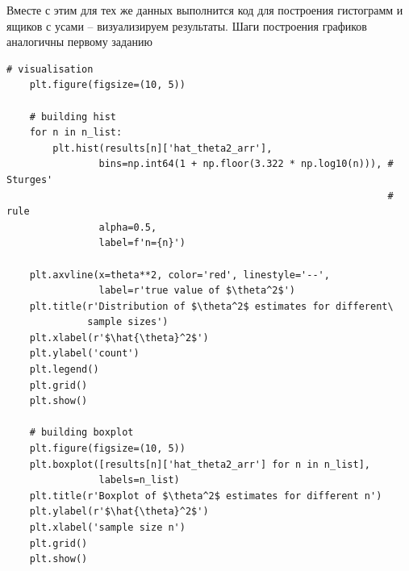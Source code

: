 \documentclass[a4paper, 12pt]{article}
\begin{document}
    Вместе с этим для тех же данных выполнится код для построения гистограмм и ящиков с усами -- визуализируем результаты.
    Шаги построения графиков аналогичны первому заданию
    \begin{lstlisting}[label=graphs2, caption={Код для визуализации результатов}]
    # visualisation
    plt.figure(figsize=(10, 5))

    # building hist
    for n in n_list:
        plt.hist(results[n]['hat_theta2_arr'], 
                bins=np.int64(1 + np.floor(3.322 * np.log10(n))), # Sturges'
                                                                  # rule
                alpha=0.5, 
                label=f'n={n}')

    plt.axvline(x=theta**2, color='red', linestyle='--',
                label=r'true value of $\theta^2$')
    plt.title(r'Distribution of $\theta^2$ estimates for different\
              sample sizes')
    plt.xlabel(r'$\hat{\theta}^2$')
    plt.ylabel('count')
    plt.legend()
    plt.grid()
    plt.show()

    # building boxplot
    plt.figure(figsize=(10, 5))
    plt.boxplot([results[n]['hat_theta2_arr'] for n in n_list],
                labels=n_list)
    plt.title(r'Boxplot of $\theta^2$ estimates for different n')
    plt.ylabel(r'$\hat{\theta}^2$')
    plt.xlabel('sample size n')
    plt.grid()
    plt.show()
    \end{lstlisting}
\end{document}
